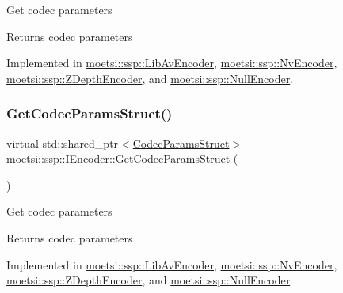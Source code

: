 Get codec parameters \begin{DoxyReturn}{Returns}
codec parameters 
\end{DoxyReturn}


Implemented in \hyperlink{classmoetsi_1_1ssp_1_1LibAvEncoder_a2ff6afafbb5da48e900d34d70a46d00c}{moetsi\+::ssp\+::\+Lib\+Av\+Encoder}, \hyperlink{classmoetsi_1_1ssp_1_1NvEncoder_aa6229a43b12d2f27e27f518fc2229b61}{moetsi\+::ssp\+::\+Nv\+Encoder}, \hyperlink{classmoetsi_1_1ssp_1_1ZDepthEncoder_a3fc9f84387dba09d1deb4761031b598f}{moetsi\+::ssp\+::\+Z\+Depth\+Encoder}, and \hyperlink{classmoetsi_1_1ssp_1_1NullEncoder_a29839bd02ad42ecd9cf8e6cce707a9fe}{moetsi\+::ssp\+::\+Null\+Encoder}.

\mbox{\label{classmoetsi_1_1ssp_1_1IEncoder_ad5179efaa4c74207766dd64f46f4059a}} 
\subsubsection{\texorpdfstring{Get\+Codec\+Params\+Struct()}{GetCodecParamsStruct()}\hspace{0.1cm}{\footnotesize\ttfamily [2/2]}}
{\footnotesize\ttfamily virtual std\+::shared\+\_\+ptr$<$\hyperlink{structmoetsi_1_1ssp_1_1CodecParamsStruct}{Codec\+Params\+Struct}$>$ moetsi\+::ssp\+::\+I\+Encoder\+::\+Get\+Codec\+Params\+Struct (\begin{DoxyParamCaption}{ }\end{DoxyParamCaption})\hspace{0.3cm}{\ttfamily [pure virtual]}}

Get codec parameters \begin{DoxyReturn}{Returns}
codec parameters 
\end{DoxyReturn}


Implemented in \hyperlink{classmoetsi_1_1ssp_1_1LibAvEncoder_a2ff6afafbb5da48e900d34d70a46d00c}{moetsi\+::ssp\+::\+Lib\+Av\+Encoder}, \hyperlink{classmoetsi_1_1ssp_1_1NvEncoder_aa6229a43b12d2f27e27f518fc2229b61}{moetsi\+::ssp\+::\+Nv\+Encoder}, \hyperlink{classmoetsi_1_1ssp_1_1ZDepthEncoder_a3fc9f84387dba09d1deb4761031b598f}{moetsi\+::ssp\+::\+Z\+Depth\+Encoder}, and \hyperlink{classmoetsi_1_1ssp_1_1NullEncoder_a29839bd02ad42ecd9cf8e6cce707a9fe}{moetsi\+::ssp\+::\+Null\+Encoder}.


